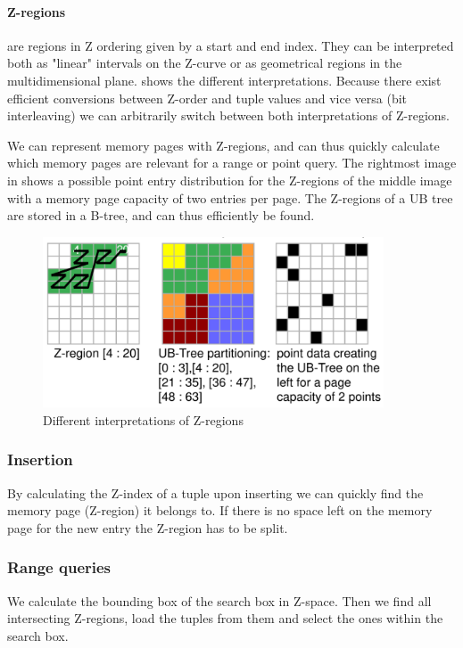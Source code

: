 \documentclass{article}
\begin{document}
\paragraph{Z-regions} are regions in Z ordering given by a start and end index.
They can be interpreted both as "linear" intervals on the Z-curve or as geometrical regions in the multidimensional plane.
 shows the different interpretations.
Because there exist efficient conversions between Z-order and tuple values and vice versa (bit interleaving) we can arbitrarily switch between both interpretations of Z-regions.

We can represent memory pages with Z-regions, and can thus quickly calculate which memory pages are relevant for a range or point query.
The rightmost image in  shows a possible point entry distribution for the Z-regions of the middle image with a memory page capacity of two entries per page.
The Z-regions of a UB tree are stored in a B-tree, and can thus efficiently be found.

\begin{figure}[p]
    \centering
    \includegraphics[width=0.9\textwidth]{z-region.png}
    \caption{Different interpretations of Z-regions}
    \label{fig:z-region}
\end{figure}

\subsubsection{Insertion}
By calculating the Z-index of a tuple upon inserting we can quickly find the memory page (Z-region) it belongs to.
If there is no space left on the memory page for the new entry the Z-region has to be split.

\subsubsection{Range queries}
We calculate the bounding box of the search box in Z-space.
Then we find all intersecting Z-regions, load the tuples from them and select the ones within the search box.
\end{document}
